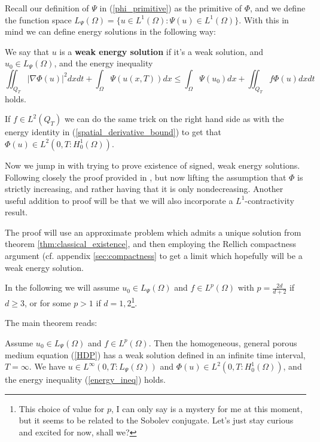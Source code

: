 \documentclass[11pt, a4paper]{article}
\begin{document}
Recall our definition of $\Psi$ in (\ref{phi_primitive}) as the primitive of $\Phi$,
and we define the function space $L_\Psi(\Omega) = \{ u\in L^1(\Omega): \Psi(u)\in L^1(\Omega)\}$.
With this in mind we can define energy solutions in the following way:
\begin{mydef}
We say that $u$ is a \textbf{weak energy solution} if it's a weak solution, and $u_0 \in L_\Psi(\Omega)$, and the energy inequality
\begin{equation}
\label{energy_ineq}
\iint_{Q_T} |\nabla \Phi(u)|^2 dxdt + \int_\Omega \Psi(u(x,T))dx \leq \int_\Omega \Psi(u_0)dx + \iint_{Q_T}f\Phi(u)dxdt
\end{equation}
holds.
\end{mydef}
\setcounter{obs}{0}
\begin{obs}
If $f\in L^2(Q_T)$ we can do the same trick on the right hand side as with the energy identity in (\ref{spatial_derivative_bound}) to get that $\Phi(u) \in L^2(0,T: H_0^1(\Omega))$.
\end{obs}

Now we jump in with trying to prove existence of signed, weak energy solutions. Following closely the proof provided in \citep{vazquez2007porous}, but now lifting the assumption that $\Phi$ is strictly increasing, and rather having that it is only nondecreasing. Another useful addition to proof will be that we will also incorporate a $L^1$-contractivity result.

The proof will use an approximate problem which admits a unique solution from theorem \ref{thm:classical_existence}, and then employing the Rellich compactness argument (cf. appendix \ref{sec:compactness} to get a limit which hopefully will be a weak energy solution.

In the following we will assume $u_0 \in L_\Psi(\Omega)$ and $f\in L^p(\Omega)$ with $p = \frac{2d}{d+2}$ if $d \geq 3$, or for some $p>1$ if $d=1,2$\footnote{This choice of value for $p$, I can only say is a mystery for me at this moment, but it seems to be related to the Sobolev conjugate. Let's just stay curious and excited for now, shall we?}.

The main theorem reads:
\begin{theorem}
\label{thm:weak_existence}
Assume $u_0 \in L_\Psi(\Omega)$ and $f \in L^p (\Omega)$. Then the homogeneous, general porous medium equation (\ref{HDP}) has a weak solution defined in an infinite time interval, $T=\infty$. We have $u \in L^\infty(0,T:L_\Psi(\Omega))$ and $\Phi(u) \in L^2(0,T:H_0^1(\Omega))$, and the energy inequality (\ref{energy_ineq}) holds.
\end{theorem}
\end{document}
